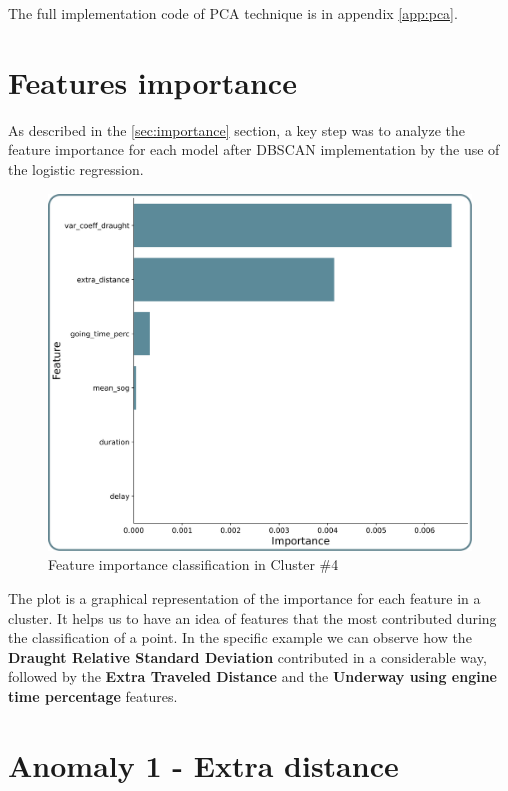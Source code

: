 The full implementation code of PCA technique is in appendix \ref{app:pca}.

\clearpage

\section{Features importance}
\label{sec:testing-importance}

As described in the \ref{sec:importance} section, a key step was to analyze the feature importance for each model after DBSCAN implementation by the use of the logistic regression.

\begin{figure}[H]
    \centering
    \includegraphics[width=15cm]{Images/3/importance.png}
    \caption{Feature importance classification in Cluster \#4}
\end{figure}

The plot is a graphical representation of the importance for each feature in a cluster. It helps us to have an idea of features that the most contributed during the classification of a point. In the specific example we can observe how the \textbf{Draught Relative Standard Deviation} contributed in a considerable way, followed by the \textbf{Extra Traveled Distance} and the \textbf{Underway using engine time percentage} features.

\clearpage

\section{Anomaly 1 - Extra distance}
\label{sec:anomaly-1}

